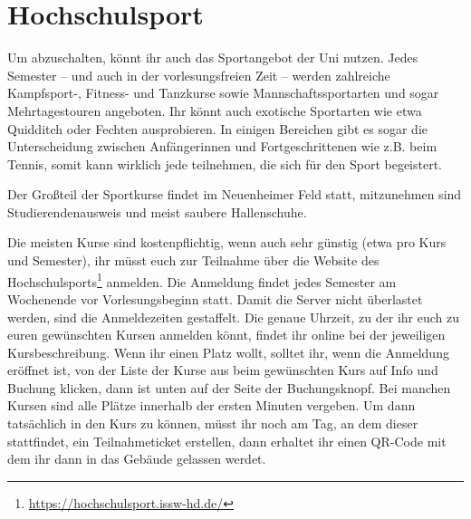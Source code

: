 \section{Hochschulsport}
Um abzuschalten, könnt ihr auch das Sportangebot der Uni nutzen. Jedes Semester -- und auch in der vorlesungsfreien Zeit -- werden zahlreiche Kampfsport-, Fitness- und Tanzkurse sowie Mannschaftssportarten und sogar Mehrtagestouren angeboten. Ihr könnt auch exotische Sportarten wie etwa Quidditch oder Fechten ausprobieren. In einigen Bereichen gibt es sogar die Unterscheidung zwischen Anfängerinnen und Fortgeschrittenen wie z.B. beim Tennis, somit kann wirklich jede teilnehmen, die sich für den Sport begeistert.

Der Großteil der Sportkurse findet im Neuenheimer Feld statt, mitzunehmen sind Studierendenausweis und meist saubere Hallenschuhe.

Die meisten Kurse sind kostenpflichtig, wenn auch sehr günstig (etwa  pro Kurs und Semester), ihr müsst euch zur Teilnahme über die Website des Hochschulsports\footnote{\url{https://hochschulsport.issw-hd.de/}} anmelden. Die Anmeldung findet jedes Semester am Wochenende vor Vorlesungsbeginn statt. Damit die Server nicht überlastet werden, sind die Anmeldezeiten gestaffelt. Die genaue Uhrzeit, zu der ihr euch zu euren gewünschten Kursen anmelden könnt, findet ihr online bei der jeweiligen Kursbeschreibung. Wenn ihr einen Platz wollt, solltet ihr, wenn die Anmeldung eröffnet ist, von der Liste der Kurse aus beim gewünschten Kurs auf Info und Buchung klicken, dann ist unten auf der Seite der Buchungsknopf. Bei manchen Kursen sind alle Plätze innerhalb der ersten Minuten vergeben. Um dann tatsächlich in den Kurs zu können, müsst ihr noch am Tag, an dem dieser stattfindet, ein Teilnahmeticket erstellen, dann erhaltet ihr einen QR-Code mit dem ihr dann in das Gebäude gelassen werdet.

